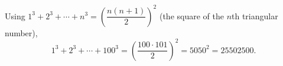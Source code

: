 Using $1^3+2^3+\cdots+n^3=\left(\dfrac{n(n+1)}{2}\right)^2$ (the square of the $n$th triangular number),
\[1^3+2^3+\cdots+100^3=\left(\dfrac{100\cdot101}{2}\right)^2=5050^2=\boxed{25502500}.\]

